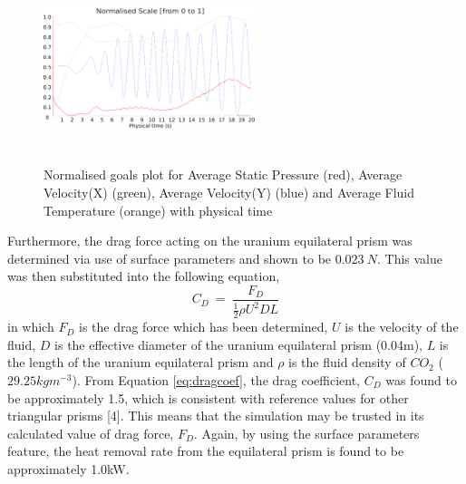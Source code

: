 \documentclass[a4paper,11pt,onecolumn]{article}
\begin{document}
\begin{figure}[ht!]
\centering
    	\includegraphics[height=5.5cm,width=0.55\textwidth]{q13.pdf}
    	\caption{Normalised goals plot for Average Static Pressure (red), Average
Velocity(X) (green), Average Velocity(Y) (blue) and Average Fluid Temperature
(orange) with physical time}
\label{fig:q13}
\end{figure}
Furthermore, the drag force acting on the uranium equilateral prism was
determined via use of surface parameters and shown to be $0.023~N$. This value
was then substituted into the following equation,
\begin{equation}
    C_{D}~=~\frac{F_{D}}{\frac{1}{2}\rho U^{2}DL}
\label{eq:dragcoef}
\end{equation}
in which $F_{D}$ is the drag force which has been determined, $U$ is the
velocity of the fluid, $D$ is the effective diameter of the uranium
equilateral prism (0.04m), $L$ is the length of the uranium equilateral prism
and $\rho$ is the fluid density of $CO_{2}$ ($29.25kgm^{-3}$). From
Equation \vref{eq:dragcoef}, the drag coefficient, $C_{D}$ was found to be
approximately 1.5, which is consistent with reference values for other
triangular prisms [4]. This means that the simulation may
be trusted in its calculated value of drag force, $F_{D}$. 
Again, by using the surface parameters feature, the heat removal rate from the
equilateral prism is found to be approximately 1.0kW.

\end{document}
